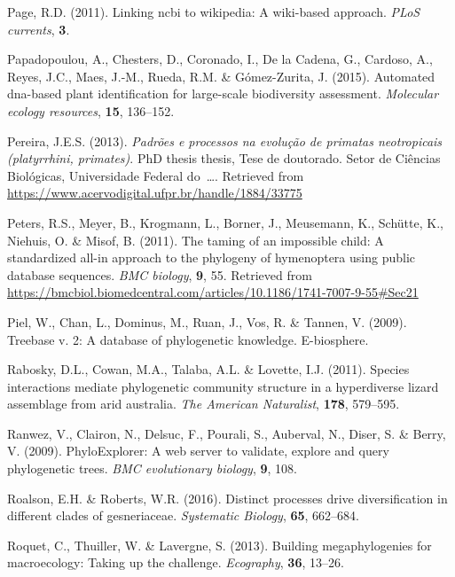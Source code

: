 \documentclass[]{article}
\begin{document}
\leavevmode\hypertarget{ref-page2011linking}{}%
Page, R.D. (2011). Linking ncbi to wikipedia: A wiki-based approach. \emph{PLoS currents}, \textbf{3}.

\leavevmode\hypertarget{ref-papadopoulou2015automated}{}%
Papadopoulou, A., Chesters, D., Coronado, I., De la Cadena, G., Cardoso, A., Reyes, J.C., Maes, J.-M., Rueda, R.M. \& Gómez-Zurita, J. (2015). Automated dna-based plant identification for large-scale biodiversity assessment. \emph{Molecular ecology resources}, \textbf{15}, 136--152.

\leavevmode\hypertarget{ref-pereira2013padroes}{}%
Pereira, J.E.S. (2013). \emph{Padrões e processos na evolução de primatas neotropicais (platyrrhini, primates)}. PhD thesis thesis, Tese de doutorado. Setor de Ciências Biológicas, Universidade Federal do~\ldots{}. Retrieved from \url{https://www.acervodigital.ufpr.br/handle/1884/33775}

\leavevmode\hypertarget{ref-peters2011taming}{}%
Peters, R.S., Meyer, B., Krogmann, L., Borner, J., Meusemann, K., Schütte, K., Niehuis, O. \& Misof, B. (2011). The taming of an impossible child: A standardized all-in approach to the phylogeny of hymenoptera using public database sequences. \emph{BMC biology}, \textbf{9}, 55. Retrieved from \url{https://bmcbiol.biomedcentral.com/articles/10.1186/1741-7007-9-55\#Sec21}

\leavevmode\hypertarget{ref-piel2009treebase}{}%
Piel, W., Chan, L., Dominus, M., Ruan, J., Vos, R. \& Tannen, V. (2009). Treebase v. 2: A database of phylogenetic knowledge. E-biosphere.

\leavevmode\hypertarget{ref-rabosky2011species}{}%
Rabosky, D.L., Cowan, M.A., Talaba, A.L. \& Lovette, I.J. (2011). Species interactions mediate phylogenetic community structure in a hyperdiverse lizard assemblage from arid australia. \emph{The American Naturalist}, \textbf{178}, 579--595.

\leavevmode\hypertarget{ref-ranwez2009phyloexplorer}{}%
Ranwez, V., Clairon, N., Delsuc, F., Pourali, S., Auberval, N., Diser, S. \& Berry, V. (2009). PhyloExplorer: A web server to validate, explore and query phylogenetic trees. \emph{BMC evolutionary biology}, \textbf{9}, 108.

\leavevmode\hypertarget{ref-roalson2016distinct}{}%
Roalson, E.H. \& Roberts, W.R. (2016). Distinct processes drive diversification in different clades of gesneriaceae. \emph{Systematic Biology}, \textbf{65}, 662--684.

\leavevmode\hypertarget{ref-roquet2013building}{}%
Roquet, C., Thuiller, W. \& Lavergne, S. (2013). Building megaphylogenies for macroecology: Taking up the challenge. \emph{Ecography}, \textbf{36}, 13--26.
\end{document}
